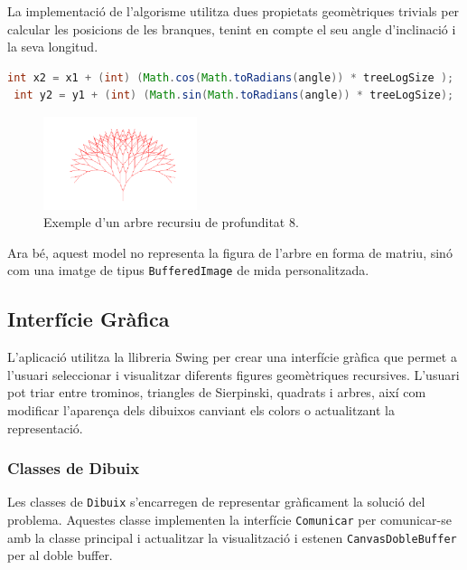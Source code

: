 \documentclass{ieeetj}
\begin{document}
La implementació de l'algorisme utilitza dues propietats geomètriques trivials per calcular les posicions de les branques, tenint en compte el seu angle d'inclinació i la seva longitud.

\begin{lstlisting}[language=Java, basicstyle=\ttfamily\small]
 int x2 = x1 + (int) (Math.cos(Math.toRadians(angle)) * treeLogSize );
 int y2 = y1 + (int) (Math.sin(Math.toRadians(angle)) * treeLogSize);
\end{lstlisting}

\begin{figure}[htbp]
\centerline{\includegraphics[width=0.4\textwidth]{docs/png/tree.png}}
\caption{Exemple d'un arbre recursiu de profunditat 8.}
\label{fig:int2}
\end{figure}

Ara bé, aquest model no representa la figura de l'arbre en forma de matriu, sinó com una imatge de tipus \texttt{BufferedImage} de mida personalitzada.


\subsection{Interfície Gràfica}
L'aplicació utilitza la llibreria Swing per crear una interfície gràfica que permet a l'usuari seleccionar i visualitzar diferents figures geomètriques recursives. L'usuari pot triar entre trominos, triangles de Sierpinski, quadrats i arbres, així com modificar l'aparença dels dibuixos canviant els colors o actualitzant la representació.
\subsubsection{Classes de Dibuix}
Les classes de \texttt{Dibuix} s'encarregen de representar gràficament la solució del problema. Aquestes classe implementen la interfície \texttt{Comunicar} per comunicar-se amb la classe principal i actualitzar la visualització i estenen \texttt{CanvasDobleBuffer} per al doble buffer.\newline
\end{document}
